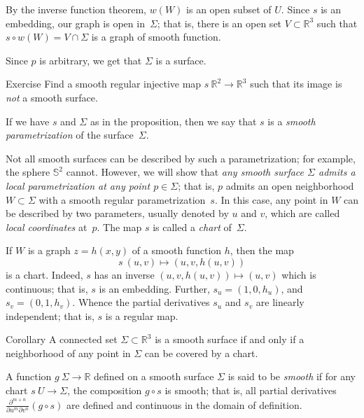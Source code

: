 By the inverse function theorem, $w(W)$ is an open subset of $U$.
Since $s$ is an embedding, our graph is open in~$\Sigma$;
that is, there is an open set $V\subset \mathbb{R}^3$ such that $s\circ w(W)=V\cap \Sigma$ is a graph of smooth function.

Since $p$ is arbitrary, we get that $\Sigma$ is a surface.
\qeds

\begin{thm}{Exercise}\label{ex:9-surf}
Find a smooth regular injective map $s\:\mathbb{R}^2\to\mathbb{R}^3$ such that its image is \textit{not} a smooth surface.
\end{thm}

If we have $s$ and $\Sigma$ as in the proposition, then we say that $s$ is a \emph{smooth parametrization} of the surface~$\Sigma$. 

Not all smooth surfaces can be described by such a parametrization;
for example, the sphere $\mathbb{S}^2$ cannot.
However, we will show that \textit{any smooth surface $\Sigma$ admits a local parametrization at any point $p\in\Sigma$}; that is,  $p$ admits an open neighborhood $W\subset \Sigma$ with a smooth regular parametrization~$s$.
In this case, any point in $W$ can be described by two parameters, usually denoted by $u$ and $v$, 
which are called \emph{local coordinates} at~$p$.
The map $s$ is called a \emph{chart} of~$\Sigma$.

If $W$ is a graph $z=h(x,y)$ of a smooth function $h$, then the map 
\[s\:(u,v)\mapsto (u,v,h(u,v))\] is a chart.
Indeed, $s$ has an inverse $(u,v,h(u,v))\mapsto (u,v)$ which is continuous;
that is, $s$ is an embedding.
Further,
$s_u=(1,0,h_u)$, and $s_v=(0,1,h_v)$. 
Whence the partial derivatives $s_u$ and $s_v$ are linearly independent;
that is, $s$ is a regular map.

\begin{thm}{Corollary}\label{cor:reg-parmeterization}
A connected set $\Sigma\subset \mathbb{R}^3$ is a smooth surface if and only if a neighborhood of any point in $\Sigma$ can be covered by a chart.
\end{thm}

A function $g\: \Sigma \to \mathbb{R}$ defined on a smooth surface $\Sigma$ is said to be \emph{smooth} if for any chart $s \: U\to \Sigma$,
the composition $g\circ s$ is smooth; that is, all partial derivatives $\frac{\partial^{m+n}}{\partial u^m\partial v^n}(g\circ s)$ are defined and continuous in the domain of definition.

